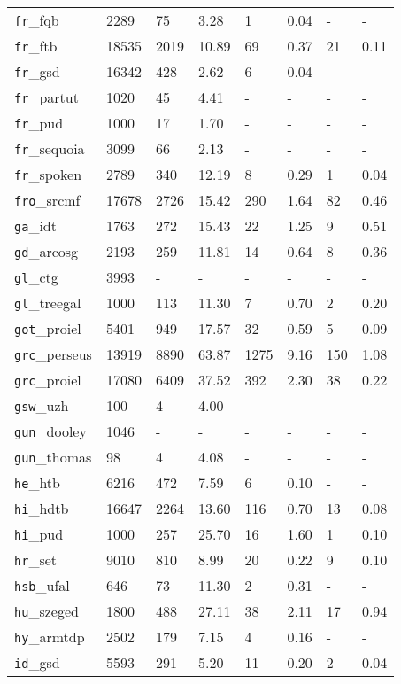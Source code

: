\begin{longtable}{|l|l|l|l|l|l|l|l|}
\texttt{fr}\_fqb & 2289 & 75 & 3.28 & 1 & 0.04 & - & -\\
\texttt{fr}\_ftb & 18535 & 2019 & 10.89 & 69 & 0.37 & 21 & 0.11\\
\texttt{fr}\_gsd & 16342 & 428 & 2.62 & 6 & 0.04 & - & -\\
\texttt{fr}\_partut & 1020 & 45 & 4.41 & - & - & - & -\\
\texttt{fr}\_pud & 1000 & 17 & 1.70 & - & - & - & -\\
\texttt{fr}\_sequoia & 3099 & 66 & 2.13 & - & - & - & -\\
\texttt{fr}\_spoken & 2789 & 340 & 12.19 & 8 & 0.29 & 1 & 0.04\\
\texttt{fro}\_srcmf & 17678 & 2726 & 15.42 & 290 & 1.64 & 82 & 0.46\\
\texttt{ga}\_idt & 1763 & 272 & 15.43 & 22 & 1.25 & 9 & 0.51\\
\texttt{gd}\_arcosg & 2193 & 259 & 11.81 & 14 & 0.64 & 8 & 0.36\\
\texttt{gl}\_ctg & 3993 & - & - & - & - & - & -\\
\texttt{gl}\_treegal & 1000 & 113 & 11.30 & 7 & 0.70 & 2 & 0.20\\
\texttt{got}\_proiel & 5401 & 949 & 17.57 & 32 & 0.59 & 5 & 0.09\\
\texttt{grc}\_perseus & 13919 & 8890 & 63.87 & 1275 & 9.16 & 150 & 1.08\\
\texttt{grc}\_proiel & 17080 & 6409 & 37.52 & 392 & 2.30 & 38 & 0.22\\
\texttt{gsw}\_uzh & 100 & 4 & 4.00 & - & - & - & -\\
\texttt{gun}\_dooley & 1046 & - & - & - & - & - & -\\
\texttt{gun}\_thomas & 98 & 4 & 4.08 & - & - & - & -\\
\texttt{he}\_htb & 6216 & 472 & 7.59 & 6 & 0.10 & - & -\\
\texttt{hi}\_hdtb & 16647 & 2264 & 13.60 & 116 & 0.70 & 13 & 0.08\\
\texttt{hi}\_pud & 1000 & 257 & 25.70 & 16 & 1.60 & 1 & 0.10\\
\texttt{hr}\_set & 9010 & 810 & 8.99 & 20 & 0.22 & 9 & 0.10\\
\texttt{hsb}\_ufal & 646 & 73 & 11.30 & 2 & 0.31 & - & -\\
\texttt{hu}\_szeged & 1800 & 488 & 27.11 & 38 & 2.11 & 17 & 0.94\\
\texttt{hy}\_armtdp & 2502 & 179 & 7.15 & 4 & 0.16 & - & -\\
\texttt{id}\_gsd & 5593 & 291 & 5.20 & 11 & 0.20 & 2 & 0.04\\

\end{longtable}
